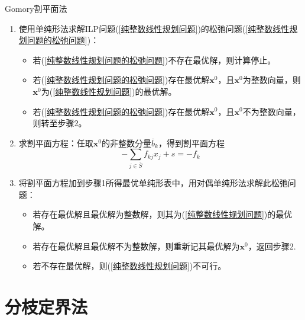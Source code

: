 \documentclass[lang = cn, scheme = chinese, thmcnt = section]{elegantbook}
\newcommand{\bs}{\boldsymbol}          %
\begin{document}
\begin{theorem}{Gomory割平面法}
	\begin{enumerate}
		\item 使用单纯形法求解ILP问题(\ref{纯整数线性规划问题})的松弛问题(\ref{纯整数线性规划问题的松弛问题})：
		\begin{itemize}
			\item 若(\ref{纯整数线性规划问题的松弛问题})不存在最优解，则计算停止。
			\item 若(\ref{纯整数线性规划问题的松弛问题})存在最优解$\bs{x}^0$，且$\bs{x}^0$为整数向量，则$\bs{x}^0$为(\ref{纯整数线性规划问题})的最优解。
			\item 若(\ref{纯整数线性规划问题的松弛问题})存在最优解$\bs{x}^0$，且$\bs{x}^0$不为整数向量，则转至步骤2。
		\end{itemize}
		\item 求割平面方程：任取$\bs{x}^0$的非整数分量$\overline{b}_k$，得到割平面方程
		$$
		-\sum_{j\in\overline{S}}{f_{kj}x_j}+s=-f_k
		$$
		\item 将割平面方程加到步骤1所得最优单纯形表中，用对偶单纯形法求解此松弛问题：
		\begin{itemize}
			\item 若存在最优解且最优解为整数解，则其为(\ref{纯整数线性规划问题})的最优解。
			\item 若存在最优解且最优解不为整数解，则重新记其最优解为$\bs{x}^0$，返回步骤2.
			\item 若不存在最优解，则(\ref{纯整数线性规划问题})不可行。
		\end{itemize}
	\end{enumerate}
\end{theorem}

\section{分枝定界法}
\end{document}
